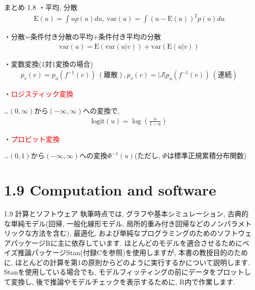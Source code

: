 \documentclass[10pt,dvipdfmx,a4]{beamer}
\newcommand{\eqn}[1]{\begin{align*}#1\end{align*}}
\newcommand{\tcr}[1]{\textcolor{red}{#1}}
\begin{document}

\begin{frame}{まとめ 1.8}
・平均, 分散
\eqn{\text{E}(u)=\int u p(u)du,\ \text{var}(u)=\int (u-\text{E}(u))^2 p(u)du}

・分散=条件付き分散の平均+条件付き平均の分散
\eqn{\text{var}(u)=\text{E}(\text{var}(u|v))+\text{var}(\text{E}(u|v))}

・変数変換(1対1変換の場合)
\eqn{p_v(v)=p_u(f^{-1}(v))\ (\text{離散}), p_v(v)=|J|p_u(f^{-1}(v))\ (\text{連続})}

・\tcr{ロジスティック変換}

…$(0,\infty)$から$(-\infty,\infty)$への変換で,
\eqn{\text{logit}(u)=\log \left(\frac{u}{1-u}\right)}

・\tcr{プロビット変換}

…$(0,1)$から$(-\infty,\infty)$への変換$\Phi^{-1}(u)$(ただし, $\Phi$は標準正規累積分布関数)
\end{frame}

\section{1.9 Computation and software}
\begin{frame}{1.9 計算とソフトウェア}
執筆時点では, グラフや基本シミュレーション, 古典的な単純モデル(回帰, 一般化線形モデル, 局所的重み付き回帰などのノンパラメトリックな方法を含む), 最適化, および単純なプログラミングのためのソフトウェアパッケージRに主に依存しています.
ほとんどのモデルを適合させるためにベイズ推論パッケージStan(付録Cを参照)を使用しますが, 本書の教授目的のために, ほとんどの計算を第1の原則からどのように実行するかについて説明します.
Stanを使用している場合でも, モデルフィッティングの前にデータをプロットして変換し, 後で推論やモデルチェックを表示するために, R内で作業します.
\end{frame}

\end{document}
